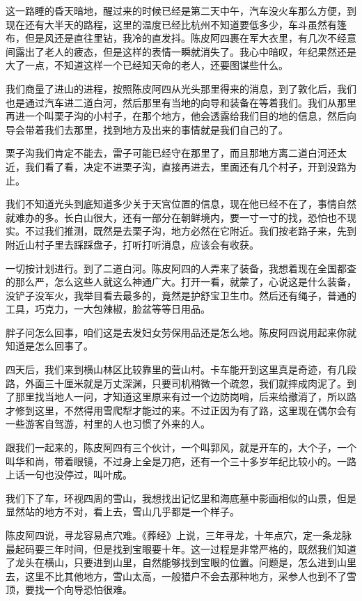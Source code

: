这一路睡的昏天暗地，醒过来的时候已经是第二天中午，汽车没火车那么方便，到现在还有大半天的路程，这里的温度已经比杭州不知道要低多少，车斗虽然有篷布，但是风还是直往里钻，我冷的直发抖。陈皮阿四裹在军大衣里，有几次不经意间露出了老人的疲态，但是这样的表情一瞬就消失了。我心中暗叹，年纪果然还是大了一点，不知道这样一个已经知天命的老人，还要图谋些什么。

我们商量了进山的进程，按照陈皮阿四从光头那里得来的消息，到了敦化后，我们也是通过汽车进二道白河，然后那里有当地的向导和装备在等着我们。我们从那里再进一个叫栗子沟的小村子，在那个地方，他会透露给我们目的地的信息，然后向导会带着我们去那里，找到地方及出来的事情就是我们自己的了。

栗子沟我们肯定不能去，雷子可能已经守在那里了，而且那地方离二道白河还太近，我们看了看，决定不进栗子沟，直接再进去，里面还有几个村子，开到没路为止。

我们不知道光头到底知道多少关于天宫位置的信息，现在他已经不在了，事情自然就难办的多。长白山很大，还有一部分在朝鲜境内，要一寸一寸的找，恐怕也不现实。不过我们推测，既然是去栗子沟，地方必然在它附近。我们按老路子来，先到附近山村子里去踩踩盘子，打听打听消息，应该会有收获。

一切按计划进行。到了二道白河。陈皮阿四的人弄来了装备，我想着现在全国都查的那么严，怎么这些人就这么神通广大。打开一看，就蒙了，心说这是什么装备，没铲子没军火，我举目看去最多的，竟然是护舒宝卫生巾。然后还有绳子，普通的工具，巧克力，一大包辣椒，脸盆等等日用品。

胖子问怎么回事，咱们这是去发妇女劳保用品还是怎么地。陈皮阿四说用起来你就知道是怎么回事了。

四天后，我们来到横山林区比较靠里的营山村。卡车能开到这里真是奇迹，有几段路，外面三十厘米就是万丈深渊，只要司机稍微一个疏忽，我们就摔成肉泥了。到了那里找当地人一问，才知道这里原来有过一个边防岗哨，后来给撤消了，所以路才修到这里，不然得用雪爬犁才能过的来。不过正因为有了路，这里现在偶尔会有一些游客自驾游，村里的人也习惯了外来的人。

跟我们一起来的，陈皮阿四有三个伙计，一个叫郭风，就是开车的，大个子，一个叫华和尚，带着眼镜，不过身上全是刀疤，还有一个三十多岁年纪比较小的。一路上话一句也没停过，叫叶成。

我们下了车，环视四周的雪山，我想找出记忆里和海底墓中影画相似的山景，但是显然站的地方不对，看上去，雪山几乎都是一个样子。

陈皮阿四说，寻龙容易点穴难。《葬经》上说，三年寻龙，十年点穴，定一条龙脉最起码要三年时间，但是找到宝眼要十年。这一过程是非常严格的，既然我们知道了龙头在横山，只要进到山里，自然能够找到宝眼的位置。问题是，怎么进到山里去，这里不比其他地方，雪山太高，一般猎户不会去那种地方，采参人也到不了雪顶，要找一个向导恐怕很难。

